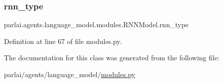 \subsubsection{\texorpdfstring{rnn\+\_\+type}{rnn\_type}}
{\footnotesize\ttfamily parlai.\+agents.\+language\+\_\+model.\+modules.\+R\+N\+N\+Model.\+rnn\+\_\+type}



Definition at line 67 of file modules.\+py.



The documentation for this class was generated from the following file\+:\begin{DoxyCompactItemize}
\item 
parlai/agents/language\+\_\+model/\hyperlink{parlai_2agents_2language__model_2modules_8py}{modules.\+py}\end{DoxyCompactItemize}
